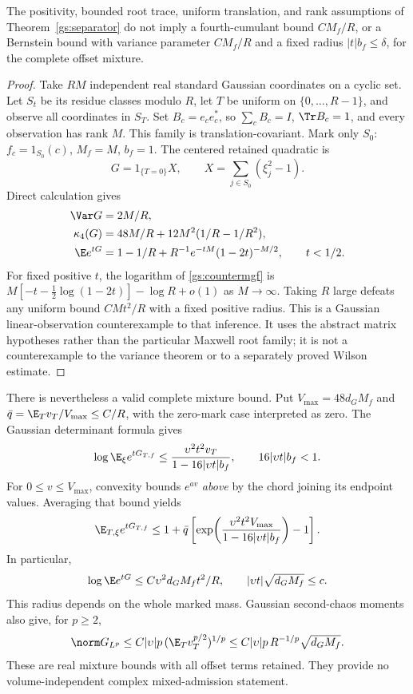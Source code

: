 \begin{proposition}
\label{gs:counterexample}
The positivity, bounded root trace, uniform translation, and rank assumptions
of Theorem~\ref{gs:separator} do not imply a fourth-cumulant bound
\(C M_f/R\), or a Bernstein bound with variance parameter \(CM_f/R\) and a
fixed radius \(|t|b_f\le\delta\), for the complete offset mixture.
\end{proposition}
\begin{proof}
Take \(RM\) independent real standard Gaussian coordinates on a cyclic set.
Let \(S_t\) be its residue classes modulo \(R\), let \(T\) be uniform on
\(\{0,\ldots,R-1\}\), and observe all coordinates in \(S_T\). Set
\(B_c=e_ce_c^*\), so \(\sum_cB_c=I\), \(\Tr B_c=1\), and every observation
has rank \(M\). This family is translation-covariant. Mark only \(S_0\):
\(f_c=1_{S_0}(c)\), \(M_f=M\), \(b_f=1\). The centered retained quadratic is
\[
 G=1_{\{T=0\}}X,\qquad X=\sum_{j\in S_0}(\xi_j^2-1).
\]
Direct calculation gives
\begin{align}
 \Var G&=2M/R,\notag\\
 \kappa_4(G)&=48M/R+12M^2(1/R-1/R^2),\label{gs:counterkappa}\\
 \E e^{tG}&=1-1/R+R^{-1}e^{-tM}(1-2t)^{-M/2},\qquad t<1/2.
 \label{gs:countermgf}
\end{align}
For fixed positive \(t\), the logarithm of \eqref{gs:countermgf} is
\(M[-t-\tfrac12\log(1-2t)]-\log R+o(1)\) as \(M\to\infty\).
Taking \(R\) large defeats any uniform bound \(CMt^2/R\) with a fixed
positive radius. This is a Gaussian linear-observation counterexample to that
inference. It uses the abstract matrix hypotheses rather than the particular
Maxwell root family; it is not a counterexample to the variance theorem or to a
separately proved Wilson estimate.
\end{proof}

There is nevertheless a valid complete mixture bound. Put
\(V_{\max}=48d_GM_f\) and \(\bar q=\E_Tv_T/V_{\max}\le C/R\), with the
zero-mark case interpreted as zero. The Gaussian determinant formula gives
\[
 \log\E_\xi e^{tG_{T,f}}
 \le\frac{\upsilon^2t^2v_T}{1-16|\upsilon t|b_f},
 \qquad16|\upsilon t|b_f<1.
\]
For \(0\le v\le V_{\max}\), convexity bounds \(e^{av}\) \emph{above} by
the chord joining its endpoint values. Averaging that bound yields
\begin{equation}
 \E_{T,\xi}e^{tG_{T,f}}
 \le1+\bar q\left[
 \exp\!\left(\frac{\upsilon^2t^2V_{\max}}
                   {1-16|\upsilon t|b_f}\right)-1\right].
 \label{gs:validmixturemgf}
\end{equation}
In particular,
\begin{equation}
 \log\E e^{tG}\le C\upsilon^2d_GM_ft^2/R,
 \qquad |\upsilon t|\sqrt{d_GM_f}\le c.
 \label{gs:smallmixtureradius}
\end{equation}
This radius depends on the whole marked mass. Gaussian second-chaos moments
also give, for \(p\ge2\),
\[
 \norm G_{L^p}
 \le C|\upsilon|p\,(\E_Tv_T^{p/2})^{1/p}
 \le C|\upsilon|p\,R^{-1/p}\sqrt{d_GM_f}.
\]
These are real mixture bounds with all offset terms retained. They provide no
volume-independent complex mixed-admission statement.

